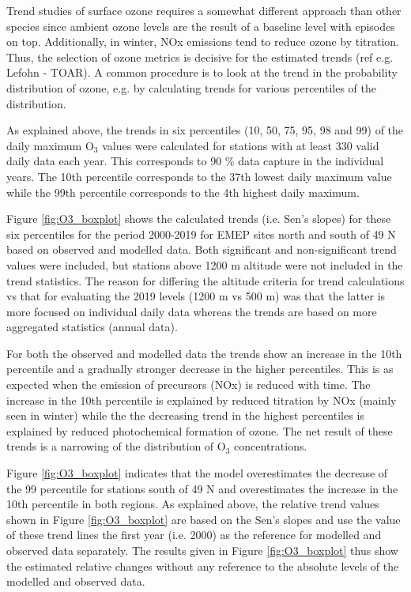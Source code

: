 Trend studies of surface ozone requires a somewhat different approach than other species since ambient ozone levels are the result of a baseline level with episodes on top. Additionally, in winter, NOx emissions tend to reduce ozone by titration. Thus, the selection of ozone metrics is decisive for the estimated trends (ref e.g. Lefohn - TOAR). A common procedure is to look at the trend in the probability distribution of ozone, e.g. by calculating trends for various percentiles of the distribution.  

As explained above, the trends in six percentiles (10, 50, 75, 95, 98 and 99) of the daily maximum O$_3$ values were calculated for stations with at least 330 valid daily data each year. This corresponds to 90 \% data capture in the individual years. The 10th percentile corresponds to the 37th lowest daily maximum value while the 99th percentile corresponds to the 4th highest daily maximum. 

Figure \ref{fig:O3_boxplot} shows the calculated trends (i.e. Sen's slopes) for these six percentiles for the period 2000-2019 for EMEP sites north and south of 49 \degrees N based on observed and modelled data. Both significant and non-significant trend values were included, but stations above 1200 m altitude were not included in the trend statistics. The reason for differing the altitude criteria for trend calculations vs that for evaluating the 2019 levels (1200 m vs 500 m) was that the latter is more focused on individual daily data whereas the trends are based on more aggregated statistics (annual data). 

For both the observed and modelled data the trends show an increase in the 10th percentile and a gradually stronger decrease in the higher percentiles. This is as expected when the emission of precursors (NOx) is reduced with time. The increase in the 10th percentile is explained by reduced titration by NOx (mainly seen in winter) while the the decreasing trend in the highest percentiles is explained by reduced photochemical formation of ozone. The net result of these trends is a narrowing of the distribution of O$_3$ concentrations. 

Figure \ref{fig:O3_boxplot} indicates that the model overestimates the decrease of the 99 percentile for stations south of 49 \degrees N and overestimates the increase in the 10th percentile in both regions. As explained above, the relative trend values shown in Figure \ref{fig:O3_boxplot} are based on the Sen's slopes and use the value of these trend lines the first year (i.e. 2000) as the reference for modelled and observed data separately. The results given in Figure \ref{fig:O3_boxplot} thus show the estimated relative changes without any reference to the absolute levels of the modelled and observed data. 

